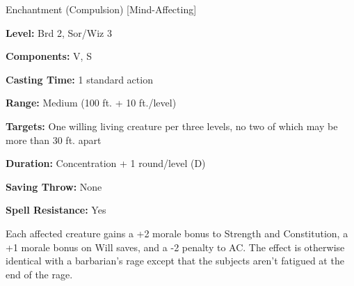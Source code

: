 
Enchantment (Compulsion) [Mind-Affecting]

\textbf{Level:} Brd 2, Sor/Wiz 3

\textbf{Components:} V, S

\textbf{Casting Time:} 1 standard action

\textbf{Range:} Medium (100 ft. + 10 ft./level)

\textbf{Targets:} One willing living creature per three levels, no two of which 
may be more than 30 ft. apart

\textbf{Duration:} Concentration + 1 round/level (D)

\textbf{Saving Throw:} None

\textbf{Spell Resistance:} Yes

Each affected creature gains a +2 morale bonus to Strength and Constitution, a 
+1 morale bonus on Will saves, and a -2 penalty to AC. The effect is otherwise 
identical with a barbarian's rage except that the subjects aren't fatigued at the 
end of the rage.

